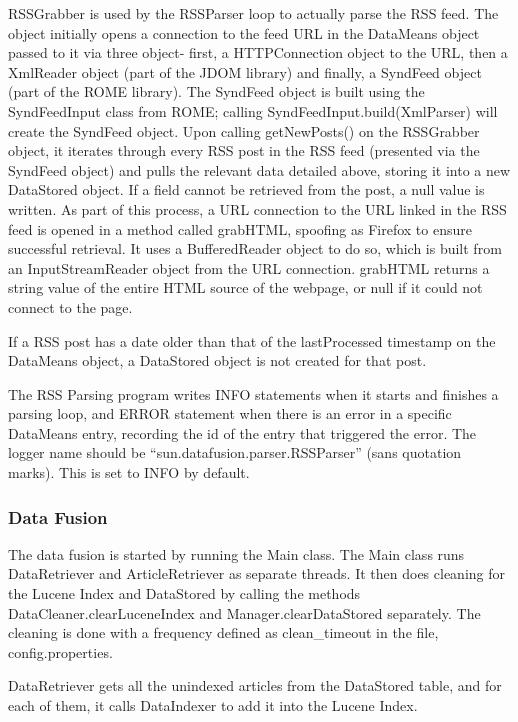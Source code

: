 \documentclass[11pt]{article} %
\begin{document}
RSSGrabber is used by the RSSParser loop to actually parse the RSS feed. The object initially opens a connection to the feed URL in the DataMeans object passed to it via three object- first, a HTTPConnection object to the URL, then a XmlReader object (part of the JDOM library) and finally, a SyndFeed object (part of the ROME library). The SyndFeed object is built using the SyndFeedInput class from ROME; calling SyndFeedInput.build(XmlParser) will create the SyndFeed object. Upon calling getNewPosts() on the RSSGrabber object, it iterates through every RSS post in the RSS feed (presented via the SyndFeed object) and pulls the relevant data detailed above, storing it into a new DataStored object. If a field cannot be retrieved from the post, a null value is written. As part of this process, a URL connection to the URL linked in the RSS feed is opened in a method called grabHTML, spoofing as Firefox to ensure successful retrieval. It uses a BufferedReader object to do so, which is built from an InputStreamReader object from the URL connection. grabHTML returns a string value of the entire HTML source of the webpage, or null if it could not connect to the page.

If a RSS post has a date older than that of the lastProcessed timestamp on the DataMeans object, a DataStored object is not created for that post.

The RSS Parsing program writes INFO statements when it starts and finishes a parsing loop, and ERROR statement when there is an error in a specific DataMeans entry, recording the id of the entry that triggered the error. The logger name should be “sun.datafusion.parser.RSSParser” (sans quotation marks). This is set to INFO by default.

\subsubsection{Data Fusion}

The data fusion is started by running the Main class. The Main class runs DataRetriever and ArticleRetriever as separate threads. It then does cleaning for the Lucene Index and DataStored by calling the methods DataCleaner.clearLuceneIndex and Manager.clearDataStored separately. The cleaning is done with a frequency defined as clean\_timeout in the file, config.properties.

DataRetriever gets all the unindexed articles from the DataStored table, and for each of them, it calls DataIndexer to add it into the Lucene Index.
\end{document}
